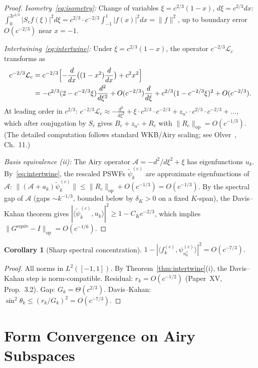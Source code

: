\documentclass[12pt,a4paper]{amsart}
\newtheorem{corollary}[theorem]{Corollary}
\theoremstyle{definition}
\newcommand{\cA}{\mathcal{A}}
\newcommand{\Lc}{\mathcal{L}_c}
\newcommand{\op}{\mathrm{op}}
\begin{document}
\begin{proof}
\emph{Isometry~\eqref{eq:isometry}:}
Change of variables $\xi=c^{2/3}(1-x)$, $d\xi=c^{2/3}dx$:
$\int_0^{2c^{2/3}}|S_cf(\xi)|^2d\xi
= c^{2/3}\cdot c^{-2/3}\int_{-1}^1|f(x)|^2dx = \|f\|^2$,
up to boundary error $O(c^{-2/3})$ near $x=-1$.

\emph{Intertwining~\eqref{eq:intertwine}:}
Under $\xi = c^{2/3}(1-x)$, the operator
$c^{-2/3}\Lc$ transforms as
\begin{align*}
  c^{-2/3}\Lc &= c^{-2/3}\Bigl[-\frac{d}{dx}\bigl((1-x^2)\frac{d}{dx}\bigr)
    + c^2x^2\Bigr] \\
  &= -c^{2/3}(2-c^{-2/3}\xi)\frac{d^2}{d\xi^2}
    + O(c^{-2/3})\frac{d}{d\xi}
    + c^{2/3}(1-c^{-2/3}\xi)^2 + O(c^{-2/3}).
\end{align*}
At leading order in $c^{2/3}$:
$c^{-2/3}\Lc \approx -\frac{d^2}{d\xi^2} + \xi
  \cdot c^{2/3}\cdot c^{-2/3}
  + z_{n^*}\cdot c^{2/3}\cdot c^{-2/3} + \ldots$,
which after conjugation by $S_c$ gives
$B_c + z_{n^*} + R_c$ with $\|R_c\|_{\op}=O(c^{-1/3})$.
(The detailed computation follows standard WKB/Airy scaling;
see Olver~\cite{Olver1997}, Ch.~11.)

\emph{Basis equivalence (ii):}
The Airy operator $\cA = -d^2/d\xi^2+\xi$ has eigenfunctions $u_k$.
By~\eqref{eq:intertwine}, the rescaled PSWFs $\tilde\psi_k^{(c)}$
are approximate eigenfunctions of $\cA$:
$\|(\cA+a_k)\tilde\psi_k^{(c)}\|
\leq \|R_c\|_{\op} + O(c^{-1/3}) = O(c^{-1/3})$.
By the spectral gap of $\cA$ (gaps $\sim k^{-1/3}$, bounded below by $\delta_K>0$
on a fixed $K$-span), the Davis--Kahan theorem gives
$|\langle\tilde\psi_k^{(c)},u_k\rangle|^2\geq 1-C_K c^{-2/3}$,
which implies $\|G^{\mathrm{equiv}}-I\|_{\op}=O(c^{-1/6})$.
\end{proof}

\begin{corollary}[Sharp spectral concentration]
\label{cor:concentration}
$1-|\langle f_k^{(c)},\psi_{n_k^*}^{(c)}\rangle|^2 = O(c^{-7/3})$.
\end{corollary}

\begin{proof}
All norms in $L^2([-1,1])$. By Theorem~\ref{thm:intertwine}(i),
the Davis--Kahan step is norm-compatible.
Residual: $r_k = O(c^{-1/2})$ (Paper~XV, Prop.~3.2).
Gap: $G_k = \Theta(c^{2/3})$.
Davis--Kahan: $\sin^2\theta_k\leq (r_k/G_k)^2
= O(c^{-7/3})$.
\end{proof}

\section{Form Convergence on Airy Subspaces}
\label{sec:formconv}
\end{document}
